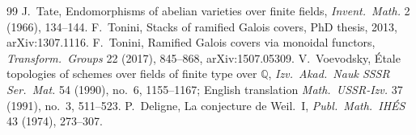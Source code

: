 \documentclass[11pt]{article}
\theoremstyle{definition}
\theoremstyle{plain}\newtheorem*{proposition}{Proposition}\theoremstyle{definition}
\begin{document}
\begin{thebibliography}{99}
 J.~Tate, Endomorphisms of abelian varieties over finite fields, \emph{Invent.\ Math.} 2 (1966), 134--144.
 F.~Tonini, Stacks of ramified Galois covers, PhD thesis, 2013, arXiv:1307.1116.
 F.~Tonini, Ramified Galois covers via monoidal functors, \emph{Transform.\ Groups} 22 (2017), 845--868, arXiv:1507.05309.
 V.~Voevodsky, Étale topologies of schemes over fields of finite type over $\mathbb Q$, \emph{Izv.\ Akad.\ Nauk SSSR Ser.\ Mat.} 54 (1990), no.~6, 1155--1167; English translation \emph{Math.\ USSR-Izv.} 37 (1991), no.~3, 511--523.
 P.~Deligne, La conjecture de Weil.~I, \emph{Publ.\ Math.\ IHÉS} 43 (1974), 273--307.
\end{thebibliography}
\end{document}
